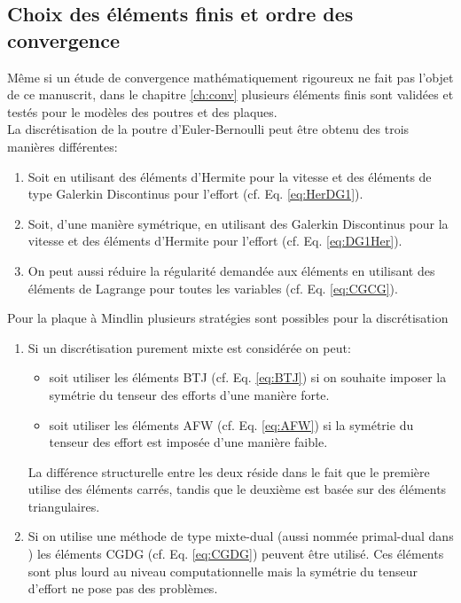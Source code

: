 \subsection*{Choix des éléments finis et ordre des convergence}
 
Même si un étude de convergence mathématiquement rigoureux ne fait pas l'objet de ce manuscrit, dans le chapitre \ref{ch:conv} plusieurs éléments finis sont validées et testés pour le modèles des poutres et des plaques. \\

La discrétisation de la poutre d'Euler-Bernoulli peut être obtenu des trois manières différentes:
\begin{enumerate}
\item Soit en utilisant des éléments d'Hermite pour la vitesse et des éléments de type Galerkin Discontinus pour l'effort (cf. Eq. \eqref{eq:HerDG1}). 
\item Soit, d'une manière symétrique, en utilisant des Galerkin Discontinus pour la vitesse et des éléments d'Hermite pour l'effort (cf. Eq. \eqref{eq:DG1Her}). 
\item On peut aussi réduire la régularité demandée aux éléments en utilisant des éléments de Lagrange pour toutes les variables (cf. Eq. \eqref{eq:CGCG}).
\end{enumerate}
 
Pour la plaque à Mindlin plusieurs stratégies sont possibles pour la discrétisation
\begin{enumerate}
	\item Si un discrétisation purement mixte est considérée on peut:
	\begin{itemize}
		\item soit utiliser les éléments BTJ (cf. Eq. \eqref{eq:BTJ}) si on souhaite imposer la symétrie du tenseur des efforts d'une manière forte.
		\item soit utiliser les éléments AFW (cf. Eq. \eqref{eq:AFW}) si la symétrie du tenseur des effort est imposée d'une manière faible.
	\end{itemize}  
	La différence structurelle entre les deux réside dans le fait que le première utilise des éléments carrés, tandis que le deuxième est basée sur des éléments triangulaires.
	\item Si on utilise une méthode de type mixte-dual (aussi nommée primal-dual dans \cite{joly2003variational}) les éléments CGDG (cf. Eq. \eqref{eq:CGDG}) peuvent être utilisé. Ces éléments sont plus lourd au niveau computationnelle mais la symétrie du tenseur d'effort ne pose pas des problèmes.
\end{enumerate}

